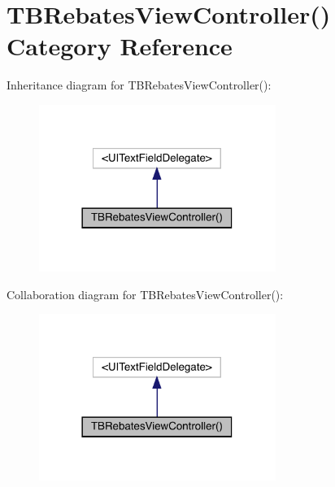 \hypertarget{category_t_b_rebates_view_controller_07_08}{}\section{T\+B\+Rebates\+View\+Controller() Category Reference}
\label{category_t_b_rebates_view_controller_07_08}


Inheritance diagram for T\+B\+Rebates\+View\+Controller()\+:\nopagebreak
\begin{figure}[H]
\begin{center}
\leavevmode
\includegraphics[width=218pt]{category_t_b_rebates_view_controller_07_08__inherit__graph}
\end{center}
\end{figure}


Collaboration diagram for T\+B\+Rebates\+View\+Controller()\+:\nopagebreak
\begin{figure}[H]
\begin{center}
\leavevmode
\includegraphics[width=218pt]{category_t_b_rebates_view_controller_07_08__coll__graph}
\end{center}
\end{figure}

